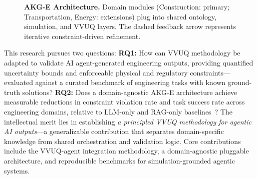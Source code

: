 \documentclass[conference, 10pt]{IEEEtran}
\begin{document}
\begin{figure}[t]
{
    }%
    \caption{\textbf{AKG-E Architecture.} Domain modules (Construction: primary; Transportation, Energy: extensions) plug into shared ontology, simulation, and VVUQ layers. The dashed feedback arrow represents iterative constraint-driven refinement.}
    \label{fig:framework}
    \vspace{-0.5em}
\end{figure}

This research pursues two questions: \textbf{RQ1:} How can VVUQ methodology be adapted to validate AI agent-generated engineering outputs, providing quantified uncertainty bounds and enforceable physical and regulatory constraints---evaluated against a curated benchmark of engineering tasks with known ground-truth solutions? \textbf{RQ2:} Does a domain-agnostic AKG-E architecture achieve measurable reductions in constraint violation rate and task success rate across engineering domains, relative to LLM-only and RAG-only baselines~\cite{Lewis2020RAG}? The intellectual merit lies in establishing \textit{a principled VVUQ methodology for agentic AI outputs}---a generalizable contribution that separates domain-specific knowledge from shared orchestration and validation logic. Core contributions include the VVUQ-agent integration methodology, a domain-agnostic pluggable architecture, and reproducible benchmarks for simulation-grounded agentic systems.
\end{document}
